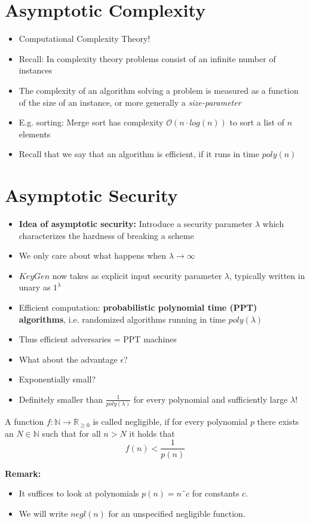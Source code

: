 	\section{Asymptotic Complexity}
		\begin{itemize}
			\item Computational Complexity Theory!
			\item Recall: In complexity theory problems consist of an infinite number of instances
			\item The complexity of an algorithm solving a problem is measured as a function of the size of an instance, or more generally a \textit{size-parameter}
			\item E.g. sorting: Merge sort has complexity $\mathcal{O}(n \cdot log(n))$ to sort a list of $n$ elements
			\item Recall that we say that an algorithm is efficient, if it runs in time $poly(n)$
		\end{itemize}
		
	\section{Asymptotic Security}
		\begin{itemize}
			\item \textbf{Idea of asymptotic security:} Introduce a security parameter $\lambda$ which characterizes the hardness of breaking a scheme
			\item We only care about what happens when $\lambda \rightarrow \infty$
			\item $KeyGen$ now takes as explicit input security parameter $\lambda$, typically written in unary as $1^{\lambda}$
			\item Efficient computation: \textbf{probabilistic polynomial time (PPT) algorithms}, i.e. randomized algorithms running in time $poly(\lambda)$
			\item Thus efficient adversaries = PPT machines
			\item What about the advantage $\epsilon$?
			\item Exponentially small?
			\item Definitely smaller than $\frac{1}{poly(\lambda)}$ for every polynomial and sufficiently large $\lambda$!
		\end{itemize}

		\begin{definition}
	    	A function $f: \mathbb{N} \to \mathbb{R}_{\geq 0}$ is called negligible, if for every polynomial $p$ there exists an 
	    	$N \in \mathbb{N}$ such that for all $n > N$ it holds that
	    		$$f(n) < \frac{1}{p(n)}$$
	
	    	\textbf{Remark:}
	    	\begin{itemize}
	        	\item It suffices to look at polynomials $p(n) = nˆc$ for constants $c$.
	        	\item We will write $negl(n)$ for an unspecified negligible function.\newline\newline
	    	\end{itemize}
		\end{definition}
		
